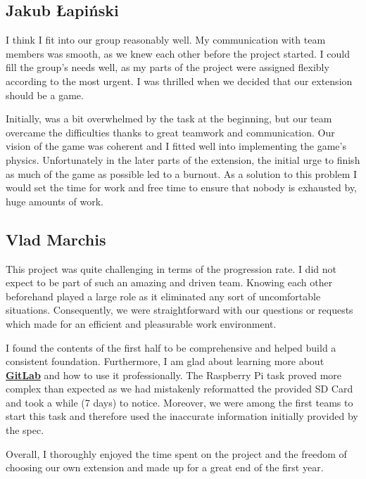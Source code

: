 \documentclass{article}
\begin{document}
\subsection{Jakub Łapiński}
I think I fit into our group reasonably well. My communication with team members was smooth, as we knew each other before the project started. I could fill the group’s needs well, as my parts of the project were assigned flexibly according to the most urgent. I was thrilled when we decided that our extension should be a game. \par
Initially, was a bit overwhelmed by the task at the beginning, but our team overcame the difficulties thanks to great teamwork and communication. Our vision of the game was coherent and I fitted well into implementing the game’s physics. Unfortunately in the later parts of the extension, the initial urge to finish as much of the game as possible led to a burnout. As a solution to this problem I would set the time for work and free time to ensure that nobody is exhausted by, huge amounts of work.
\subsection{Vlad Marchis}
This project was quite challenging in terms of the progression rate. I did not expect to be part of such an amazing and driven team. Knowing each other beforehand played a large role as it eliminated any sort of uncomfortable situations. Consequently, we were straightforward with our questions or requests which made for an efficient and pleasurable work environment.  \par
I found the contents of the first half to be comprehensive and helped build a consistent foundation. Furthermore, I am glad about learning more about \href{https://gitlab.doc.ic.ac.uk/}{\textbf{GitLab}} and how to use it professionally. The Raspberry Pi task proved more complex than expected as we had mistakenly reformatted the provided SD Card and took a while (7 days) to notice. Moreover, we were among the first teams to start this task and therefore used the inaccurate information initially provided by the spec.\par
Overall, I thoroughly enjoyed the time spent on the project and the freedom of choosing our own extension and made up for a great end of the first year.
\end{document}
